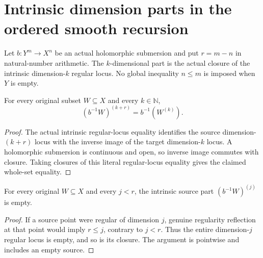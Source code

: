 \section{Intrinsic dimension parts in the ordered smooth recursion}

Let $b:Y^m\to X^n$ be an actual holomorphic submersion and put
$r=m-n$ in natural-number arithmetic.  The $k$-dimensional part is the
actual closure of the intrinsic dimension-$k$ regular locus.  No
global inequality $n\le m$ is imposed when $Y$ is empty.

\begin{lemma}
\label{hir:original-dimension-part-smooth-shift}
\leanok
For every original subset $W\subseteq X$ and every $k\in\mathbb N$,
\[
 (b^{-1}W)^{(k+r)}=b^{-1}(W^{(k)}).
\]
\end{lemma}
\begin{proof}
The actual intrinsic regular-locus equality identifies the source
dimension-$(k+r)$ locus with the inverse image of the target
dimension-$k$ locus.  A holomorphic submersion is continuous and open,
so inverse image commutes with closure.  Taking closures of this
literal regular-locus equality gives the claimed whole-set equality.
\end{proof}

\begin{lemma}
\label{hir:original-dimension-part-below-smooth-fibre-empty}
\leanok
For every original $W\subseteq X$ and every $j<r$, the intrinsic
source part $(b^{-1}W)^{(j)}$ is empty.
\end{lemma}
\begin{proof}
If a source point were regular of dimension $j$, genuine regularity
reflection at that point would imply $r\le j$, contrary to $j<r$.
Thus the entire dimension-$j$ regular locus is empty, and so is its
closure.  The argument is pointwise and includes an empty source.
\end{proof}

